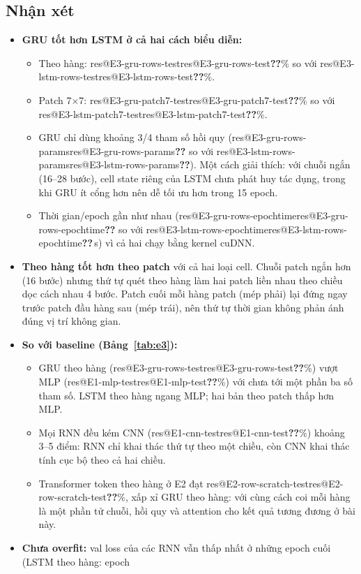 \documentclass[twoside,final]{hcmut-report}
\makeatletter
\newcommand{\res}[1]{\ifcsname res@#1\endcsname\csname res@#1\endcsname\else\textbf{??}\fi}
\makeatother
\begin{document}
\subsection{Nhận xét}
\begin{itemize}
  \item \textbf{GRU tốt hơn LSTM ở cả hai cách biểu diễn:}
        \begin{itemize}
          \item Theo hàng: \res{E3-gru-rows-test}\% so với \res{E3-lstm-rows-test}\%.
          \item Patch 7$\times$7: \res{E3-gru-patch7-test}\% so với \res{E3-lstm-patch7-test}\%.
          \item GRU chỉ dùng khoảng 3/4 tham số hồi quy (\res{E3-gru-rows-params} so với \res{E3-lstm-rows-params}).
                Một cách giải thích: với chuỗi ngắn (16--28 bước), cell state riêng của LSTM chưa phát huy tác dụng, trong khi GRU ít cổng hơn nên dễ tối ưu hơn trong 15 epoch.
          \item Thời gian/epoch gần như nhau (\res{E3-gru-rows-epochtime} so với \res{E3-lstm-rows-epochtime}\,s) vì cả hai chạy bằng kernel cuDNN.
        \end{itemize}
  \item \textbf{Theo hàng tốt hơn theo patch} với cả hai loại cell. Chuỗi patch ngắn hơn (16 bước) nhưng thứ tự quét theo hàng làm hai patch liền nhau theo chiều dọc cách nhau 4 bước. Patch cuối mỗi hàng patch (mép phải) lại đứng ngay trước patch đầu hàng sau (mép trái), nên thứ tự thời gian không phản ánh đúng vị trí không gian.
  \item \textbf{So với baseline (Bảng~\ref{tab:e3}):}
        \begin{itemize}
          \item GRU theo hàng (\res{E3-gru-rows-test}\%) vượt MLP (\res{E1-mlp-test}\%) với chưa tới một phần ba số tham số. LSTM theo hàng ngang MLP; hai bản theo patch thấp hơn MLP.
          \item Mọi RNN đều kém CNN (\res{E1-cnn-test}\%) khoảng 3--5 điểm: RNN chỉ khai thác thứ tự theo một chiều, còn CNN khai thác tính cục bộ theo cả hai chiều.
          \item Transformer token theo hàng ở E2 đạt \res{E2-row-scratch-test}\%, xấp xỉ GRU theo hàng: với cùng cách coi mỗi hàng là một phần tử chuỗi, hồi quy và attention cho kết quả tương đương ở bài này.
        \end{itemize}
  \item \textbf{Chưa overfit:} val loss của các RNN vẫn thấp nhất ở những epoch cuối (LSTM theo hàng: epoch

\end{itemize}
\end{document}
